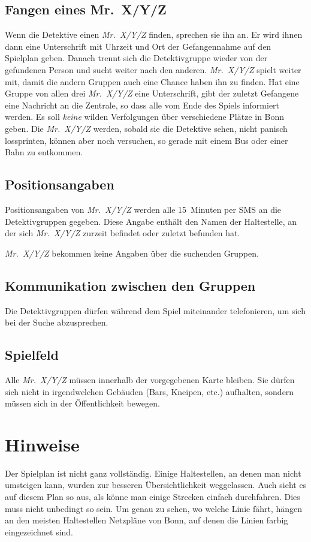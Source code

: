 \subsection*{Fangen eines Mr.~X/Y/Z}
Wenn die Detektive einen \emph{Mr.~X/Y/Z} finden, sprechen sie ihn an. Er wird ihnen
dann eine Unterschrift mit Uhrzeit und Ort der Gefangennahme auf den Spielplan
geben. Danach trennt sich die Detektivgruppe wieder von der gefundenen Person und sucht weiter nach den
anderen. \emph{Mr.~X/Y/Z} spielt weiter mit, damit die andern Gruppen auch eine Chance
haben ihn zu finden. Hat eine Gruppe von allen drei \emph{Mr.~X/Y/Z} eine Unterschrift,
gibt der zuletzt Gefangene eine Nachricht an die Zentrale, so dass alle vom Ende
des Spiels informiert werden.
Es soll \emph{keine} wilden Verfolgungen über verschiedene Plätze in Bonn geben. Die \emph{Mr.~X/Y/Z} werden, sobald sie die Detektive sehen, nicht panisch lossprinten, können aber noch versuchen, so gerade mit einem Bus oder einer Bahn zu entkommen.
\subsection*{Positionsangaben}
Positionsangaben von \emph{Mr.~X/Y/Z} werden alle 15~Minuten per SMS an die
Detektivgruppen gegeben. Diese Angabe enthält den Namen der Haltestelle, an der
sich \emph{Mr.~X/Y/Z} zurzeit befindet oder zuletzt befunden hat. 

\emph{Mr.~X/Y/Z} bekommen keine Angaben über die suchenden Gruppen.
\subsection*{Kommunikation zwischen den Gruppen}
Die Detektivgruppen dürfen während dem Spiel miteinander telefonieren, um sich
bei der Suche abzusprechen.
\subsection*{Spielfeld}
Alle \emph{Mr.~X/Y/Z} müssen innerhalb der vorgegebenen Karte bleiben. Sie dürfen sich
nicht in irgendwelchen Gebäuden (Bars, Kneipen, etc.) aufhalten, sondern müssen
sich in der Öffentlichkeit bewegen. 
\section*{Hinweise}
Der Spielplan ist nicht ganz vollständig. Einige Haltestellen,
an denen man nicht umsteigen kann, wurden zur besseren Übersichtlichkeit
weggelassen. Auch sieht es auf diesem Plan so aus, als könne man einige Strecken
einfach durchfahren. Dies muss nicht unbedingt so sein. Um genau zu sehen, wo
welche Linie fährt, hängen an den meisten Haltestellen Netzpläne von Bonn, auf
denen die Linien farbig eingezeichnet sind.

